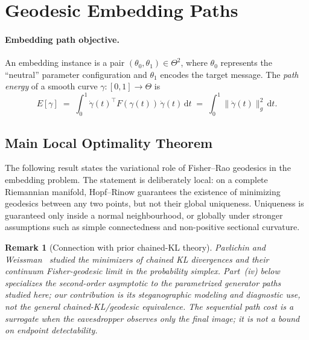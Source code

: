 \documentclass[a4paper,fleqn]{cas-dc}
\newtheorem{remark}{Remark}
\begin{document}
\section{Geodesic Embedding Paths}
\label{sec:geodesics}

\paragraph{Embedding path objective.}

An embedding instance is a pair $(\theta_0, \theta_1)\in\Theta^2$, where
$\theta_0$ represents the ``neutral'' parameter configuration and $\theta_1$
encodes the target message.
The \emph{path energy} of a smooth curve $\gamma:[0,1]\to\Theta$ is
\begin{equation}
  E[\gamma] \;=\; \int_0^1 \dot\gamma(t)^\top F(\gamma(t))\,\dot\gamma(t)\,\mathrm{d}t
  \;=\; \int_0^1 \|\dot\gamma(t)\|_g^2\,\mathrm{d}t.
  \label{eq:path_energy}
\end{equation}

\subsection{Main Local Optimality Theorem}
\label{sec:geodesic_optimality}

The following result states the variational role of Fisher--Rao geodesics in
the embedding problem.  The statement is deliberately local: on a complete
Riemannian manifold, Hopf--Rinow guarantees the existence of minimizing
geodesics between any two points, but not their global uniqueness.  Uniqueness
is guaranteed only inside a normal neighbourhood, or globally under stronger
assumptions such as simple connectedness and non-positive sectional curvature.

\begin{remark}[Connection with prior chained-KL theory]
Pavlichin and Weissman~\cite{pavlichin2016chained} studied the
minimizers of chained KL divergences and their continuum Fisher-geodesic
limit in the probability simplex. Part~(iv) below specializes the
second-order asymptotic to the parametrized generator paths studied here;
our contribution is its steganographic modeling and diagnostic use, not
the general chained-KL/geodesic equivalence.
The sequential path cost is a surrogate when the eavesdropper observes
only the final image; it is not a bound on endpoint detectability.
\end{remark}
\end{document}
